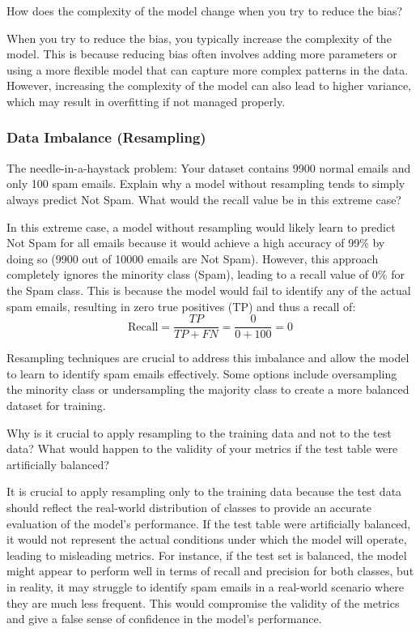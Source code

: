 \begin{ejercicio}
    How does the complexity of the model change when you try to reduce the bias?

    When you try to reduce the bias, you typically increase the complexity of the model. This is because reducing bias often involves adding more parameters or using a more flexible model that can capture more complex patterns in the data. However, increasing the complexity of the model can also lead to higher variance, which may result in overfitting if not managed properly.
\end{ejercicio}

\subsubsection*{Data Imbalance (Resampling)}
\begin{ejercicio}
    The needle-in-a-haystack problem: Your dataset contains 9900 normal emails and only 100 spam emails. Explain why a model without resampling tends to simply always predict Not Spam. What would the recall value be in this extreme case?

    In this extreme case, a model without resampling would likely learn to predict Not Spam for all emails because it would achieve a high accuracy of 99\% by doing so (9900 out of 10000 emails are Not Spam). However, this approach completely ignores the minority class (Spam), leading to a recall value of 0\% for the Spam class. This is because the model would fail to identify any of the actual spam emails, resulting in zero true positives (TP) and thus a recall of:
    \begin{equation*}
        \text{Recall} = \frac{TP}{TP + FN} = \frac{0}{0 + 100} = 0
    \end{equation*}

    Resampling techniques are crucial to address this imbalance and allow the model to learn to identify spam emails effectively. Some options include oversampling the minority class or undersampling the majority class to create a more balanced dataset for training.
\end{ejercicio}
\begin{ejercicio}
    Why is it crucial to apply resampling to the training data and not to the test data? What would happen to the validity of your metrics if the test table were artificially balanced?

    It is crucial to apply resampling only to the training data because the test data should reflect the real-world distribution of classes to provide an accurate evaluation of the model's performance. If the test table were artificially balanced, it would not represent the actual conditions under which the model will operate, leading to misleading metrics. For instance, if the test set is balanced, the model might appear to perform well in terms of recall and precision for both classes, but in reality, it may struggle to identify spam emails in a real-world scenario where they are much less frequent. This would compromise the validity of the metrics and give a false sense of confidence in the model's performance.
\end{ejercicio}

